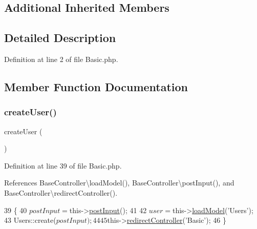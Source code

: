 \subsection*{Additional Inherited Members}


\subsection{Detailed Description}


Definition at line 2 of file Basic.\+php.



\subsection{Member Function Documentation}
\hypertarget{class_basic_a967982ee98f05287bbdba812f6016947}{}\label{class_basic_a967982ee98f05287bbdba812f6016947} 
\subsubsection{\texorpdfstring{create\+User()}{createUser()}}
{\footnotesize\ttfamily create\+User (\begin{DoxyParamCaption}{ }\end{DoxyParamCaption})}



Definition at line 39 of file Basic.\+php.



References Base\+Controller\textbackslash{}load\+Model(), Base\+Controller\textbackslash{}post\+Input(), and Base\+Controller\textbackslash{}redirect\+Controller().


\begin{DoxyCode}
39                                  \{
40         $postInput = $this->\hyperlink{class_base_controller_a170629218b28c1759a89c4978b9323b3}{postInput}();
41 
42         $user = $this->\hyperlink{class_base_controller_a5fa8890bd3a9d20f5c0cc2377dc49eb1}{loadModel}(\textcolor{stringliteral}{'Users'});
43         Users::create($postInput);
44 
45         $this->\hyperlink{class_base_controller_a85ddb683efc64655be063b697f631beb}{redirectController}(\textcolor{stringliteral}{'Basic'});
46     \}
\end{DoxyCode}
\hypertarget{class_basic_a934aeeec370d904f3a58bde4d514259d}{}\label{class_basic_a934aeeec370d904f3a58bde4d514259d} 
